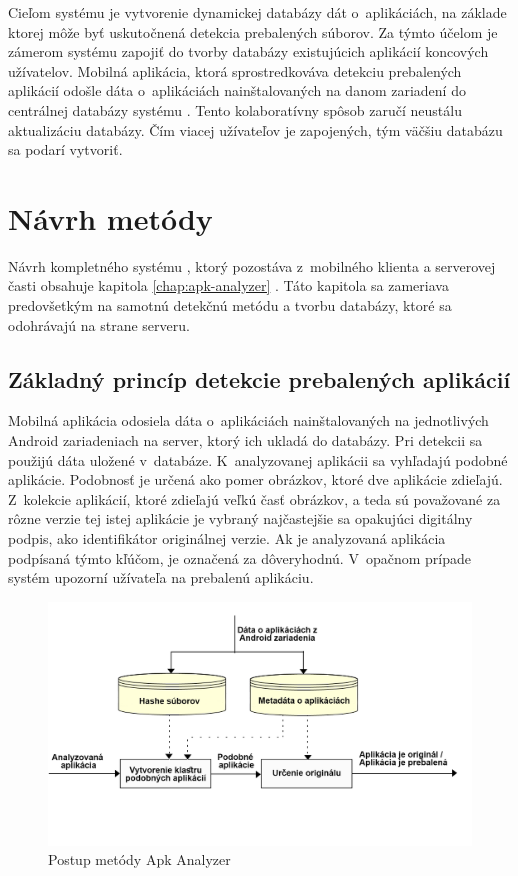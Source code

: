 Cieľom systému  je vytvorenie dynamickej databázy dát o~aplikáciách, na základe ktorej môže byť uskutočnená detekcia prebalených súborov.
Za týmto účelom je zámerom systému  zapojiť do tvorby databázy existujúcich aplikácií koncových užívatelov. Mobilná aplikácia, ktorá sprostredkováva detekciu prebalených aplikácií odošle dáta o~aplikáciách nainštalovaných na danom zariadení do centrálnej databázy systému . Tento kolaboratívny spôsob zaručí neustálu aktualizáciu databázy. Čím viacej užívateľov je zapojených, tým väčšiu databázu sa podarí vytvoriť.

\section{Návrh metódy}
Návrh kompletného systému , ktorý pozostáva z~mobilného klienta a serverovej časti obsahuje kapitola \ref{chap:apk-analyzer} . Táto kapitola sa zameriava predovšetkým na samotnú detekčnú metódu a tvorbu databázy, ktoré sa odohrávajú na strane serveru.

\subsection{Základný princíp detekcie prebalených aplikácií}
Mobilná aplikácia  odosiela dáta o~aplikáciách nainštalovaných na jednotlivých Android zariadeniach na server, ktorý ich ukladá do databázy. Pri detekcii sa použijú dáta uložené v~databáze. K~analyzovanej aplikácii sa vyhľadajú podobné aplikácie. Podobnosť je určená ako pomer obrázkov, ktoré dve aplikácie zdieľajú. Z~kolekcie aplikácií, ktoré zdieľajú veľkú časť obrázkov, a teda sú považované za rôzne verzie tej istej aplikácie je vybraný najčastejšie sa opakujúci digitálny podpis, ako identifikátor originálnej verzie. Ak je analyzovaná aplikácia podpísaná týmto kľúčom, je označená za dôveryhodnú. V~opačnom prípade systém upozorní užívateľa na prebalenú aplikáciu. 

\begin{figure}[htb]
  \begin{center}
    \includegraphics[width=130mm]{images/detection-overview.png}
  \end{center}
  \caption{Postup metódy Apk Analyzer}
  \label{fig:metódaApkAnalyzer}
\end{figure}

